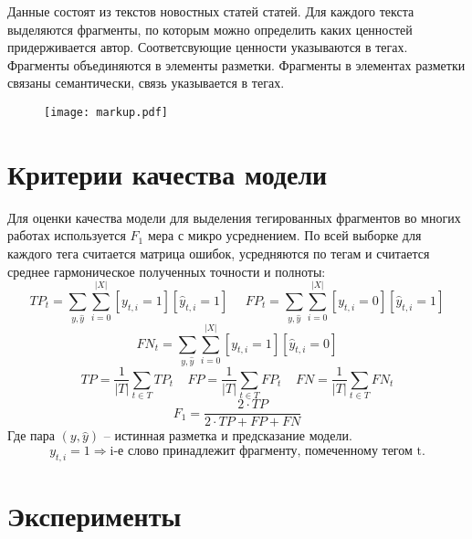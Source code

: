 \documentclass{article}
\begin{document}
Данные состоят из текстов новостных статей статей. Для каждого текста выделяются фрагменты, по которым можно определить каких ценностей придерживается автор. Соответсвующие ценности указываются в тегах. Фрагменты объединяются в элементы разметки. Фрагменты в элементах разметки связаны семантически, связь указывается в тегах.

\begin{figure}[h]
    \centering
    \texttt{[image: markup.pdf]}
\end{figure}

\section{Критерии качества модели}

Для оценки качества модели для выделения тегированных фрагментов во многих работах используется $F_1$ мера с микро усреднением. По всей выборке для каждого тега считается матрица ошибок, усредняются по тегам и считается среднее гармоническое полученных точности и полноты:
$$
TP_t = \sum_{y, \hat{y}} \sum_{i=0}^{|X|} [y_{t, i} = 1][\hat{y}_{t, i} = 1] ~~~~~~
FP_t = \sum_{y, \hat{y}} \sum_{i=0}^{|X|} [y_{t, i} = 0][\hat{y}_{t, i} = 1]
$$
$$
FN_t = \sum_{y, \hat{y}} \sum_{i=0}^{|X|} [y_{t, i} = 1][\hat{y}_{t, i} = 0]
$$
$$
TP = \frac{1}{|T|} \sum_{t \in T} TP_t~~~~~
FP = \frac{1}{|T|} \sum_{t \in T} FP_t~~~~~
FN = \frac{1}{|T|} \sum_{t \in T} FN_t
$$
$$
F_1 = \frac{2 \cdot TP}{2 \cdot TP + FP + FN}
$$
Где пара $(y, \hat{y})$ -- истинная разметка и предсказание модели.
$$
y_{t, i} = 1 \Rightarrow \text{i-е слово принадлежит фрагменту, помеченному тегом t}.
$$

\section{Эксперименты}





\end{document}
